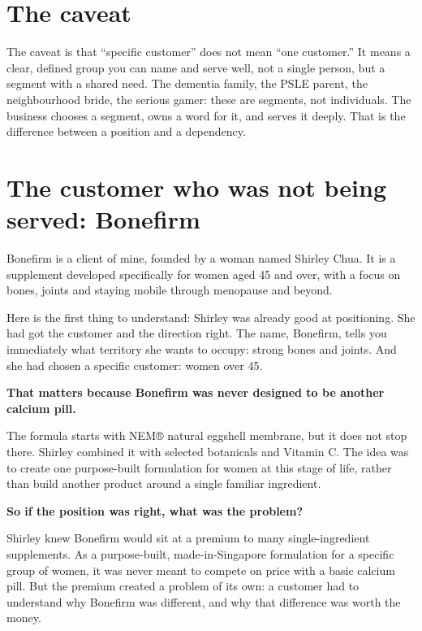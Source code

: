 \documentclass[10pt,twoside,openany]{memoir}
\newcommand{\needspacehead}{\needspace{4\baselineskip}}
\let\oldsection\section
\renewcommand{\section}{\needspacehead\oldsection}
\begin{document}
\section{The caveat}\label{the-caveat}

The caveat is that ``specific customer'' does not mean ``one customer.''
It means a clear, defined group you can name and serve well, not a
single person, but a segment with a shared need. The dementia family,
the PSLE parent, the neighbourhood bride, the serious gamer: these are
segments, not individuals. The business chooses a segment, owns a word
for it, and serves it deeply. That is the difference between a position
and a dependency.

\section{The customer who was not being served:
Bonefirm}\label{the-customer-who-was-not-being-served-bonefirm}

Bonefirm is a client of mine, founded by a woman named Shirley Chua. It
is a supplement developed specifically for women aged 45 and over, with
a focus on bones, joints and staying mobile through menopause and
beyond.

Here is the first thing to understand: Shirley was already good at
positioning. She had got the customer and the direction right. The name,
Bonefirm, tells you immediately what territory she wants to occupy:
strong bones and joints. And she had chosen a specific customer: women
over 45.

\textbf{That matters because Bonefirm was never designed to be another
calcium pill.}

The formula starts with NEM® natural eggshell membrane, but it does not
stop there. Shirley combined it with selected botanicals and Vitamin C.
The idea was to create one purpose-built formulation for women at this
stage of life, rather than build another product around a single
familiar ingredient.

\textbf{So if the position was right, what was the problem?}

Shirley knew Bonefirm would sit at a premium to many single-ingredient
supplements. As a purpose-built, made-in-Singapore formulation for a
specific group of women, it was never meant to compete on price with a
basic calcium pill. But the premium created a problem of its own: a
customer had to understand why Bonefirm was different, and why that
difference was worth the money.
\end{document}
